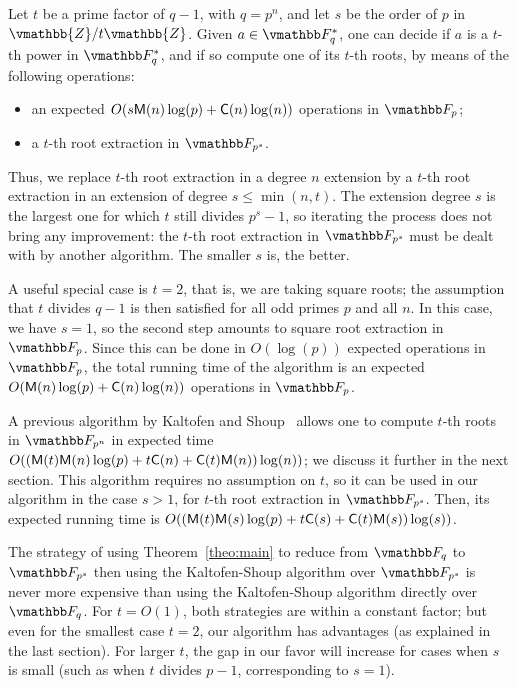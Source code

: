 \begin{theorem}\label{theo:main}
  Let $t$ be a prime factor of $q-1$, with $q=p^n$, and let $s$ be the
  order of $p$ in $\vmathbb{Z}/t\vmathbb{Z}$. Given $a\in \F_q^*$, one
  can decide if $a$ is a $t$-th power in $\F_q^*$, and if so compute
  one of its $t$-th roots, by means of the following operations:
  \begin{itemize}
  \item an expected $O(s\mathsf{M}(n)\log(p) + \mathsf{C}(n)\log(n))$ operations in
    $\F_p$;
  \item a $t$-th root extraction in $\F_{p^s}$.
  \end{itemize}
\end{theorem}

Thus, we replace $t$-th root extraction in a degree $n$ extension by a
$t$-th root extraction in an extension of degree $s \le \min(n,t)$.
The extension degree $s$ is the largest one for which $t$ still
divides $p^s-1$, so iterating the process does not bring any
improvement: the $t$-th root extraction in $\F_{p^s}$ must be dealt
with by another algorithm. The smaller $s$ is, the better.

A useful special case is $t=2$, that is, we are taking square roots;
the assumption that $t$ divides $q-1$ is then satisfied for all odd
primes $p$ and all $n$. In this case, we have $s=1$, so the second
step amounts to square root extraction in $\F_p$. Since this can be
done in $O(\log(p))$ expected operations in $\F_p$, the total running
time of the algorithm is an expected $O(\mathsf{M}(n)\log(p) + \mathsf{C}(n)\log(n))$
operations in $\F_p$. 

A previous algorithm by Kaltofen and Shoup~\cite{KaltofenShoup1997}
allows one to compute $t$-th roots in $\F_{p^n}$ in expected time
$O((\mathsf{M}(t)\mathsf{M}(n)\log(p) + t \mathsf{C}(n) + \mathsf{C}(t)\mathsf{M}(n))\log(n))$; we discuss
it further in the next section. This algorithm requires no assumption
on $t$, so it can be used in our algorithm in the case $s > 1$, for
$t$-th root extraction in $\F_{p^s}$. Then, its expected running time
is $O((\mathsf{M}(t)\mathsf{M}(s)\log(p) + t \mathsf{C}(s) + \mathsf{C}(t)\mathsf{M}(s))\log(s))$.

The strategy of using Theorem~\ref{theo:main} to reduce from $\F_q$ to
$\F_{p^s}$ then using the Kaltofen-Shoup algorithm over $\F_{p^s}$
is never more expensive than using the Kaltofen-Shoup algorithm
directly over $\F_{q}$. For $t=O(1)$, both strategies are within a
constant factor; but even for the smallest case $t=2$, our algorithm
has advantages (as explained in the last section). For larger $t$, the
gap in our favor will increase for cases when $s$ is small (such 
as when $t$ divides $p-1$, corresponding to $s=1$).

